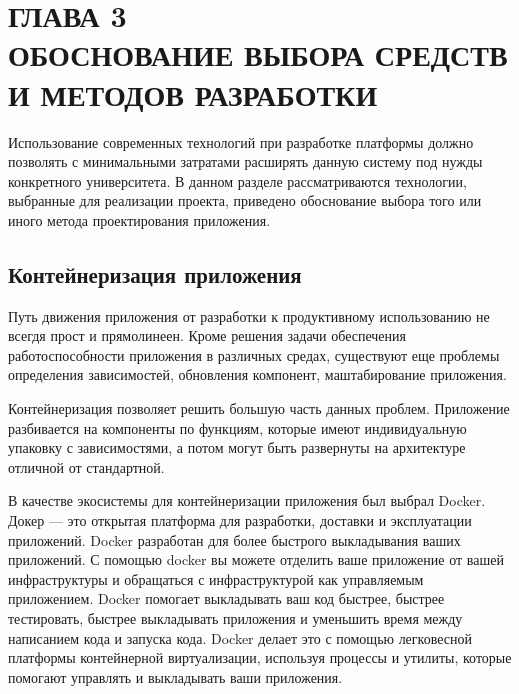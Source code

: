 \section*{ГЛАВА 3\\ ОБОСНОВАНИЕ ВЫБОРА СРЕДСТВ И МЕТОДОВ РАЗРАБОТКИ}
\setcounter{section}{3}\setcounter{subsection}{0}

Использование современных технологий при разработке платформы должно позволять
с минимальными затратами расширять данную систему под нужды конкретного университета.
В данном разделе рассматриваются технологии, выбранные для реализации проекта,
приведено обоснование выбора того или иного метода проектирования приложения.

\subsection{Контейнеризация приложения}

Путь движения приложения от разработки к продуктивному использованию не всегдя прост и
прямолинеен. Кроме решения задачи обеспечения работоспособности приложения в различных
средах, существуют еще проблемы определения зависимостей, обновления компонент,
маштабирование приложения.

Контейнеризация позволяет решить большую часть данных проблем. Приложение разбивается
на компоненты по функциям, которые имеют индивидуальную упаковку с зависимостями,
а потом могут быть развернуты на архитектуре отличной от стандартной.

В качестве экосистемы для контейнеризации приложения был выбрал Docker. Докер — это открытая
платформа для разработки, доставки и эксплуатации приложений. Docker разработан для более
быстрого выкладывания ваших приложений. С помощью docker вы можете отделить ваше приложение
от вашей инфраструктуры и обращаться с инфраструктурой как управляемым приложением.
Docker помогает выкладывать ваш код быстрее, быстрее тестировать, быстрее выкладывать
приложения и уменьшить время между написанием кода и запуска кода. Docker делает
это с помощью легковесной платформы контейнерной виртуализации, используя процессы и
утилиты, которые помогают управлять и выкладывать ваши приложения.

